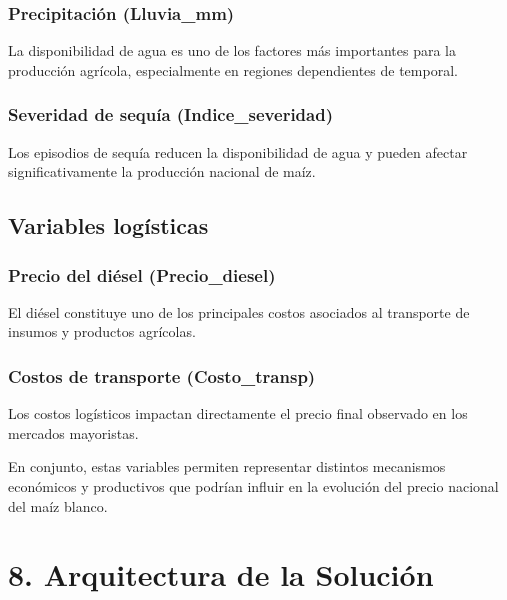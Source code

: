 \documentclass[11pt]{article}
\begin{document}
\hypertarget{precipitaciuxf3n-lluvia_mm}{%
\subsubsection{Precipitación
(Lluvia\_mm)}\label{precipitaciuxf3n-lluvia_mm}}

La disponibilidad de agua es uno de los factores más importantes para la
producción agrícola, especialmente en regiones dependientes de temporal.

\hypertarget{severidad-de-sequuxeda-indice_severidad}{%
\subsubsection{Severidad de sequía
(Indice\_severidad)}\label{severidad-de-sequuxeda-indice_severidad}}

Los episodios de sequía reducen la disponibilidad de agua y pueden
afectar significativamente la producción nacional de maíz.

\hypertarget{variables-loguxedsticas}{%
\subsection{Variables logísticas}\label{variables-loguxedsticas}}

\hypertarget{precio-del-diuxe9sel-precio_diesel}{%
\subsubsection{Precio del diésel
(Precio\_diesel)}\label{precio-del-diuxe9sel-precio_diesel}}

El diésel constituye uno de los principales costos asociados al
transporte de insumos y productos agrícolas.

\hypertarget{costos-de-transporte-costo_transp}{%
\subsubsection{Costos de transporte
(Costo\_transp)}\label{costos-de-transporte-costo_transp}}

Los costos logísticos impactan directamente el precio final observado en
los mercados mayoristas.

En conjunto, estas variables permiten representar distintos mecanismos
económicos y productivos que podrían influir en la evolución del precio
nacional del maíz blanco.

    \hypertarget{arquitectura-de-la-soluciuxf3n}{%
\section{8. Arquitectura de la
Solución}\label{arquitectura-de-la-soluciuxf3n}}
\end{document}
